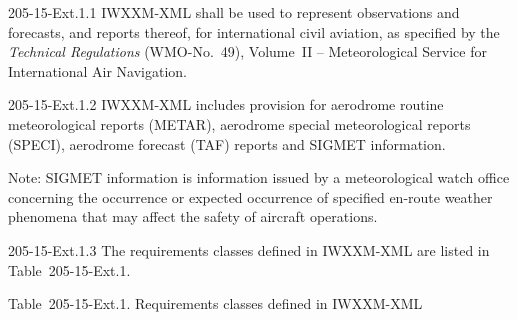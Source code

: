 205-15-Ext.1.1 IWXXM-XML shall be used to represent observations and forecasts, and reports thereof, for international civil aviation, as specified by the \emph{Technical Regulations} (WMO-No.~49), Volume~II -- Meteorological Service for International Air Navigation.

205-15-Ext.1.2 IWXXM-XML includes provision for aerodrome routine meteorological reports (METAR), aerodrome special meteorological reports (SPECI), aerodrome forecast (TAF) reports and SIGMET information.

Note: SIGMET information is information issued by a meteorological watch office concerning the occurrence or expected occurrence of specified en-route weather phenomena that may affect the safety of aircraft operations.

205-15-Ext.1.3 The requirements classes defined in IWXXM-XML are listed in Table~205-15-Ext.1.

Table~205-15-Ext.1. Requirements classes defined in IWXXM-XML

